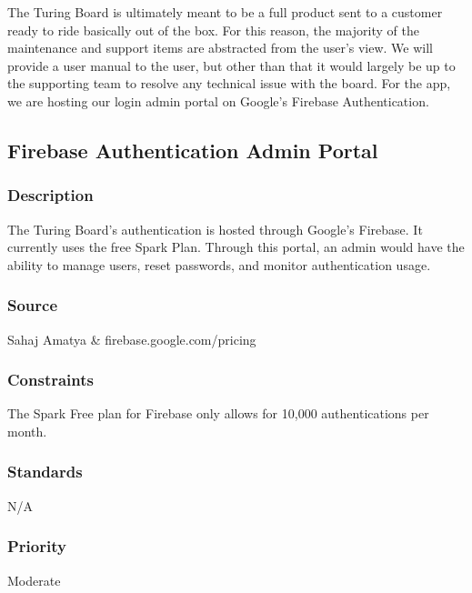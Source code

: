 The Turing Board is ultimately meant to be a full product sent to a customer ready to ride basically out of the box. For this reason, the majority of the maintenance and support items are abstracted from the user's view. We will provide a user manual to the user, but other than that it would largely be up to the supporting team to resolve any technical issue with the board. For the app, we are hosting our login admin portal on Google's Firebase Authentication. 

\subsection{Firebase Authentication Admin Portal}
\subsubsection{Description}
The Turing Board's authentication is hosted through Google's Firebase. It currently uses the free Spark Plan. Through this portal, an admin would have the ability to manage users, reset passwords, and monitor authentication usage. 
\subsubsection{Source}
Sahaj Amatya \& firebase.google.com/pricing
\subsubsection{Constraints}
The Spark Free plan for Firebase only allows for 10,000 authentications per month.
\subsubsection{Standards}
N/A
\subsubsection{Priority}
Moderate

